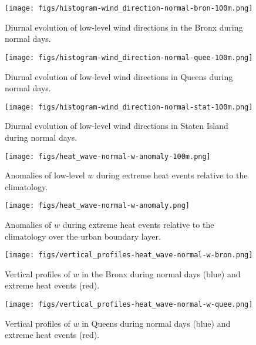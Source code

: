 \documentclass[11pt,a4paper]{article}
\begin{document}
\begin{figure}[ht]
	\centering
	\texttt{[image: figs/histogram-wind\_direction-normal-bron-100m.png]}
	\caption{Diurnal evolution of low-level wind directions in the Bronx during normal days.}
	\label{fig:histogram-wind_direction-bron-normal}
\end{figure}
\begin{figure}[ht]
	\centering
	\texttt{[image: figs/histogram-wind\_direction-normal-quee-100m.png]}
	\caption{Diurnal evolution of low-level wind directions in Queens during normal days.}
	\label{fig:histogram-wind_direction-quee-normal}
\end{figure}
\begin{figure}[ht]
	\centering
	\texttt{[image: figs/histogram-wind\_direction-normal-stat-100m.png]}
	\caption{Diurnal evolution of low-level wind directions in Staten Island during normal days.}
	\label{fig:histogram-wind_direction-stat-normal}
\end{figure}


\begin{figure}[ht]
	\centering
	\texttt{[image: figs/heat\_wave-normal-w-anomaly-100m.png]}
	\caption{Anomalies of low-level $w$ during extreme heat events relative to the climatology.}
	\label{fig:extreme-heat-normal-comparison-100m-w}
\end{figure}
\begin{figure}[ht]
	\centering
	\texttt{[image: figs/heat\_wave-normal-w-anomaly.png]}
	\caption{Anomalies of $w$ during extreme heat events relative to the climatology over the urban boundary layer.}
	\label{fig:extreme-heat-normal-comparison-contours-w}
\end{figure}
\begin{figure}[ht]
	\centering
	\texttt{[image: figs/vertical\_profiles-heat\_wave-normal-w-bron.png]}
	\caption{Vertical profiles of $w$ in the Bronx during normal days (blue) and extreme heat events (red).}
	\label{fig:extreme-heat-normal-vertical_profiles-w-bron}
\end{figure}
\begin{figure}[ht]
	\centering
	\texttt{[image: figs/vertical\_profiles-heat\_wave-normal-w-quee.png]}
	\caption{Vertical profiles of $w$ in Queens during normal days (blue) and extreme heat events (red).}
	\label{fig:extreme-heat-normal-vertical_profiles-w-quee}
\end{figure}
\end{document}
